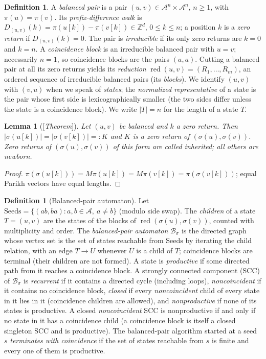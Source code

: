 \documentclass[11pt]{amsart}
\theoremstyle{plain}
\newtheorem{lemma}[theorem]{Lemma}
\theoremstyle{definition}
\newtheorem{definition}[theorem]{Definition}
\theoremstyle{remark}
\newcommand{\Z}{\mathbb{Z}}
\newcommand{\A}{\mathcal{A}}
\newcommand{\B}{\mathcal{B}}
\newcommand{\red}{\operatorname{red}}
\newcommand{\Status}[1]{\textup{[\textit{#1}]}}
\begin{document}
\begin{definition}\label{def:balanced}
A \emph{balanced pair} is a pair $(u,v)\in\A^n\times\A^n$, $n\ge1$, with $\pi(u)=\pi(v)$. Its \emph{prefix-difference walk} is $D_{(u,v)}(k)=\pi(u[k])-\pi(v[k])\in\Z^d$, $0\le k\le n$; a position $k$ is a \emph{zero return} if $D_{(u,v)}(k)=0$. The pair is \emph{irreducible} if its only zero returns are $k=0$ and $k=n$. A \emph{coincidence block} is an irreducible balanced pair with $u=v$; necessarily $n=1$, so coincidence blocks are the pairs $(a,a)$. Cutting a balanced pair at all its zero returns yields its \emph{reduction} $\red(u,v)=(R_1,\dots,R_m)$, an ordered sequence of irreducible balanced pairs (its \emph{blocks}). We identify $(u,v)$ with $(v,u)$ when we speak of \emph{states}; the \emph{normalized representative} of a state is the pair whose first side is lexicographically smaller (the two sides differ unless the state is a coincidence block). We write $|T|=n$ for the length of a state $T$.
\end{definition}

\begin{lemma}[\Status{Theorem}]\label{lem:inherited}
Let $(u,v)$ be balanced and $k$ a zero return. Then $|\sigma(u[k])|=|\sigma(v[k])|=:K$ and $K$ is a zero return of $(\sigma(u),\sigma(v))$. Zero returns of $(\sigma(u),\sigma(v))$ of this form are called \emph{inherited}; all others are \emph{newborn}.
\end{lemma}
\begin{proof}
$\pi(\sigma(u[k]))=M\pi(u[k])=M\pi(v[k])=\pi(\sigma(v[k]))$; equal Parikh vectors have equal lengths.
\end{proof}

\begin{definition}[Balanced-pair automaton]\label{def:bpa}
Let $\mathrm{Seeds}=\{(ab,ba):a,b\in\A,\ a\ne b\}$ (modulo side swap). The \emph{children} of a state $T=(u,v)$ are the states of the blocks of $\red(\sigma(u),\sigma(v))$, counted with multiplicity and order. The \emph{balanced-pair automaton} $\B_\sigma$ is the directed graph whose vertex set is the set of states reachable from $\mathrm{Seeds}$ by iterating the child relation, with an edge $T\to U$ whenever $U$ is a child of $T$; coincidence blocks are terminal (their children are not formed). A state is \emph{productive} if some directed path from it reaches a coincidence block. A strongly connected component (SCC) of $\B_\sigma$ is \emph{recurrent} if it contains a directed cycle (including loops), \emph{noncoincident} if it contains no coincidence block, \emph{closed} if every \emph{noncoincident} child of every state in it lies in it (coincidence children are allowed), and \emph{nonproductive} if none of its states is productive. A closed \emph{noncoincident} SCC is nonproductive if and only if no state in it has a coincidence child (a coincidence block is itself a closed singleton SCC and is productive). The balanced-pair algorithm started at a seed $s$ \emph{terminates with coincidence} if the set of states reachable from $s$ is finite and every one of them is productive.
\end{definition}
\end{document}
